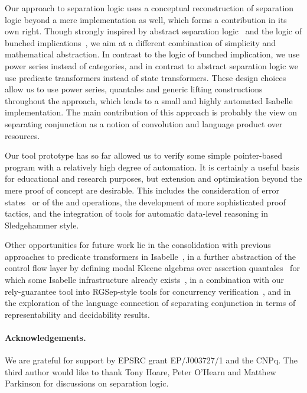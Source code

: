\documentclass[twoside,runningheads,envcountsame,envcountsect,oribibl,orivec]{llncs}
\begin{document}
Our approach to separation logic uses a conceptual reconstruction of
separation logic beyond a mere implementation as well, which forms a
contribution in its own right. Though strongly inspired by abstract
separation logic~\cite{COY07} and the logic of bunched
implications~\cite{OHearnP99}, we aim at a different combination of
simplicity and mathematical abstraction. In contrast to the logic of
bunched implication, we use power series instead of categories, and in
contrast to abstract separation logic we use predicate transformers
instead of state transformers. These design choices allow us to use
power series, quantales and generic lifting constructions throughout
the approach, which leads to a small and highly automated Isabelle
implementation. The main contribution of this approach is probably the
view on separating conjunction as a notion of convolution and language
product over resources.

Our tool prototype has so far allowed us to verify some simple
pointer-based program with a relatively high degree of automation. It
is certainly a useful basis for educational and research purposes, but
extension and optimisation beyond the mere proof of concept are
desirable. This includes the consideration of error
states~\cite{COY07} or of the  and 
operations, the development of more sophisticated proof tactics, and
the integration of tools for automatic data-level reasoning in
Sledgehammer style.

Other opportunities for future work lie in the consolidation with
previous approaches to predicate transformers in
Isabelle~\cite{Preoteasa11}, in a further abstraction of the control
flow layer by defining modal Kleene algebras over assertion
quantales~\cite{MoellerStruth} for which some Isabelle infrastructure
already exists~\cite{GuttmannSW11}, in a combination with our
rely-guarantee tool into RGSep-style tools for concurrency
verification~\cite{Vafeiadis}, and in the exploration of the language
connection of separating conjunction in terms of representability and
decidability results.

\paragraph*{Acknowledgements.}  We are grateful for support by EPSRC
grant EP/J003727/1 and the CNPq. The third author would like to thank
Tony Hoare, Peter O'Hearn and Matthew Parkinson for discussions on
separation logic.






\end{document}
